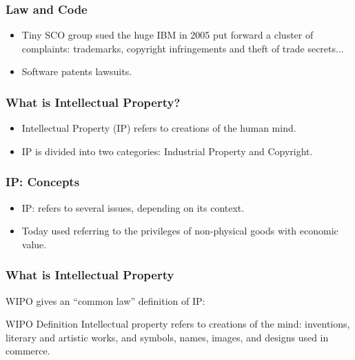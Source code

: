 

\begin{frame}
\frametitle{Law and Code}

\begin{itemize}
\item Tiny SCO group sued the huge IBM in 2005 put forward a cluster of complaints: trademarks, copyright infringements and theft of trade secrets...
\item Software patents lawsuits. 
\end{itemize}

\end{frame}





\begin{frame}
\frametitle{What is Intellectual Property?}

\begin{itemize}
\item Intellectual Property (IP) refers to creations of the human mind.
\item IP is divided into two categories: Industrial Property and Copyright.  
\end{itemize}

\end{frame}


\begin{frame}
\frametitle{IP: Concepts}

\begin{itemize}
\item IP: refers to several issues, depending on its context.
\item Today used referring to the privileges of non-physical goods with economic value.
\end{itemize}

\end{frame}



\begin{frame}
\frametitle{What is Intellectual Property}

\textsc{WIPO} gives an ``common law'' definition of IP:

\begin{block}{WIPO Definition}
  Intellectual property refers to creations of the mind:
  inventions, literary and artistic works, and symbols, names, images,
  and designs used in commerce.
\end{block}

\end{frame}




